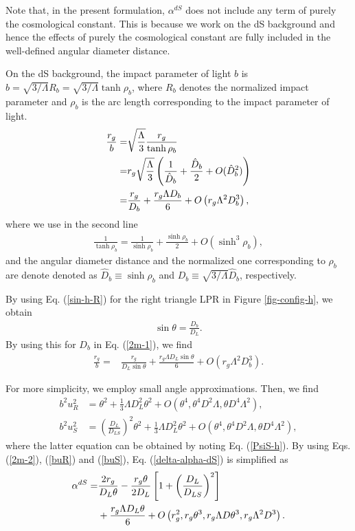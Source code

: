 \documentclass[twocolumn,showpacs,preprintnumbers,amsmath,amssymb]{revtex4-1}
\begin{document}
Note that, in the present formulation,  
$\alpha^{dS}$ does not include any term of purely the cosmological constant. 
This is because we work on the dS background and hence 
the effects of purely the cosmological constant are fully included 
in the well-defined angular diameter distance. 

On the dS background, 
the impact parameter of light $b$ is 
$b = \sqrt{3/\Lambda} R_b = \sqrt{3/\Lambda} \tanh \rho_b$, 
where 
$R_b$ denotes the normalized impact parameter 
and 
$\rho_b$ is the arc length corresponding to 
the impact parameter of light. 
\begin{align}
\frac{r_g}{b} 
=&
\sqrt{\frac{\Lambda}{3}} \frac{r_g}{\tanh\rho_b} 
\notag\\
=&
r_g \sqrt{\frac{\Lambda}{3}} 
\left(
\frac{1}{\hat D_b} + \frac{\hat D_b}{2} + O(\hat D^2_b) 
\right)
\notag\\
=&
\frac{r_g}{D_b} 
+ 
\frac{r_g \Lambda D_b}{6} 
+O\left( r_g \Lambda^2 D_b^3 \right) ,
\label{2m-1}
\end{align}
where we use in the second line 
\begin{align}
\frac{1}{\tanh\rho_b} 
= 
\frac{1}{\sinh\rho_b} + \frac{\sinh\rho_b}{2} 
+ O\left(\sinh^3\rho_b\right) , 
\label{tanh-inverse}
\end{align}
and 
the angular diameter distance and the normalized one 
corresponding to $\rho_b$ 
are denote denoted as 
$\hat D_b \equiv \sinh\rho_b$
and 
$D_b \equiv \sqrt{3/\Lambda} \hat D_b$, 
respectively.  

By using Eq. (\ref{sin-h-R}) for the right triangle LPR 
in Figure \ref{fig-config-h}, 
we obtain
\begin{align}
\sin\theta = \frac{D_b}{D_L} . 
\end{align}
By using this for $D_b$ in Eq. (\ref{2m-1}), 
we find 
\begin{align}
\frac{r_g}{b} 
=&
\frac{r_g}{D_L \sin\theta} 
+ 
\frac{r_g \Lambda D_L \sin\theta}{6} 
+O\left( r_g \Lambda^2 D_b^3 \right) . 
\label{2m-2}
\end{align}

For more simplicity, 
we employ small angle approximations. 
Then, we find 
\begin{align}
b^2u^2_R 
&= 
\theta^2 
+ \frac13 \Lambda D_L^2 \theta^2 
+ O(\theta^4, \theta^4 D^2 \Lambda, \theta D^4 \Lambda^2) , 
\label{buR}
\\
b^2u^2_S 
&= 
\left( \frac{D_L}{D_{LS}} \right)^2 \theta^2 
+ \frac13 \Lambda D_L^2 \theta^2 
+ O(\theta^4, \theta^4 D^2 \Lambda, \theta D^4 \Lambda^2) , 
\label{buS}
\end{align}
where 
the latter equation can be obtained by noting Eq. (\ref{PsiS-h}). 
By using Eqs. (\ref{2m-2}), (\ref{buR}) and (\ref{buS}), 
Eq. (\ref{delta-alpha-dS}) is simplified as 
\begin{align}
\alpha^{dS}
=&
  \frac{2 r_g}{D_L \theta} 
- \frac{r_g \theta}{2D_L} 
\left[  
1 + \left(\frac{D_L}{D_{LS}}\right)^2 
\right]
\notag\\
&
  + \frac{r_g \Lambda D_L \theta}{6} 
 + O\left(r_g^2, r_g \theta^3, r_g \Lambda D \theta^3, r_g \Lambda^2 D^3 \right) .
\label{delta-alpha-dS-2}
\end{align}
\end{document}
